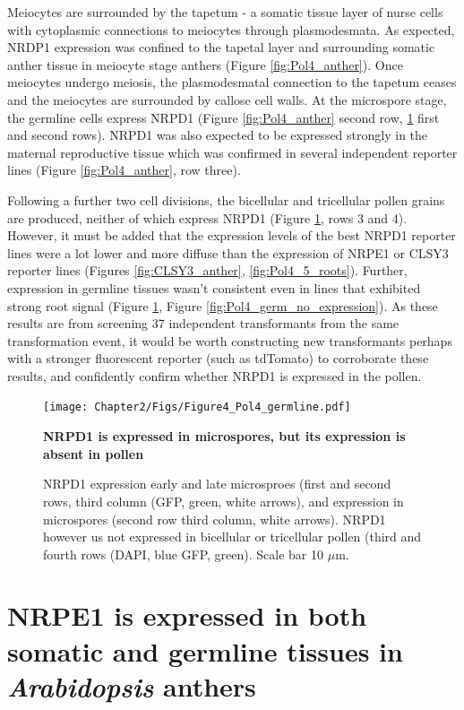 Meiocytes are surrounded by the tapetum - a somatic tissue layer of nurse cells with cytoplasmic connections to meiocytes through plasmodesmata. As expected, NRDP1 expression was confined to the tapetal layer and surrounding somatic anther tissue in meiocyte stage anthers (Figure \ref{fig:Pol4_anther}). Once meiocytes undergo meiosis, the plasmodesmatal connection to the tapetum ceases and the meiocytes are surrounded by callose cell walls. At the microspore stage, the germline cells express NRPD1 (Figure \ref{fig:Pol4_anther} second row, \ref{fig:Pol4_germ} first and second rows). NRPD1 was also expected to be expressed strongly in the maternal reproductive tissue \cite{RN165} which was confirmed in several independent reporter lines (Figure \ref{fig:Pol4_anther}, row three).

Following a further two cell divisions, the bicellular and tricellular pollen grains are produced, neither of which express NRPD1 (Figure \ref{fig:Pol4_germ}, rows 3 and 4). However, it must be added that the expression levels of the best NRPD1 reporter lines were a lot lower and more diffuse than the expression of NRPE1 or CLSY3 reporter lines (Figures \ref{fig:CLSY3_anther}, \ref{fig:Pol4_5_roots}). Further, expression in germline tissues wasn't consistent even in lines that exhibited strong root signal (Figure \ref{fig:Pol4_germ}, Figure \ref{fig:Pol4_germ_no_expression}). As these results are from screening 37 independent transformants from the same transformation event, it would be worth constructing new transformants perhaps with a stronger fluorescent reporter (such as tdTomato) to corroborate these results, and confidently confirm whether NRPD1 is expressed in the pollen. 


\begin{figure}[htbp!] 
\centering    
    \texttt{[image: Chapter2/Figs/Figure4\_Pol4\_germline.pdf]}
\caption{\textbf{NRPD1 is expressed in microspores, but its expression is absent in pollen}}
\label{fig:Pol4_germ}
\captionsetup{font=small}
    \caption*{NRPD1 expression early and late microsproes (first and second rows, third column (GFP, green, white arrows), and expression in microspores (second row third column, white arrows). NRPD1 however us not expressed in bicellular or tricellular pollen (third and fourth rows (DAPI, blue GFP, green). Scale bar 10 $\mu$m.}
\end{figure}

\section{NRPE1 is expressed in both somatic and germline tissues in \textit{Arabidopsis} anthers}

